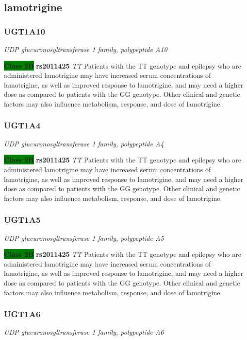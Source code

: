 \documentclass{report}
\begin{document}
\subsection{ lamotrigine }\subsubsection{ UGT1A10 }
\textit{ UDP glucuronosyltransferase 1 family, polypeptide A10 } \newline





\textbf{\colorbox{green} {Class 2B}} \textbf{ rs2011425 } \textit{ TT }
Patients with the TT genotype and epilepsy who are administered lamotrigine may have increased serum concentrations of lamotrigine, as well as improved response to lamotrigine, and may need a higher dose as compared to patients with the GG genotype. Other clinical and genetic factors may also influence metabolism, response, and dose of lamotrigine.  \newline\subsubsection{ UGT1A4 }
\textit{ UDP glucuronosyltransferase 1 family, polypeptide A4 } \newline





\textbf{\colorbox{green} {Class 2B}} \textbf{ rs2011425 } \textit{ TT }
Patients with the TT genotype and epilepsy who are administered lamotrigine may have increased serum concentrations of lamotrigine, as well as improved response to lamotrigine, and may need a higher dose as compared to patients with the GG genotype. Other clinical and genetic factors may also influence metabolism, response, and dose of lamotrigine.  \newline\subsubsection{ UGT1A5 }
\textit{ UDP glucuronosyltransferase 1 family, polypeptide A5 } \newline





\textbf{\colorbox{green} {Class 2B}} \textbf{ rs2011425 } \textit{ TT }
Patients with the TT genotype and epilepsy who are administered lamotrigine may have increased serum concentrations of lamotrigine, as well as improved response to lamotrigine, and may need a higher dose as compared to patients with the GG genotype. Other clinical and genetic factors may also influence metabolism, response, and dose of lamotrigine.  \newline\subsubsection{ UGT1A6 }
\textit{ UDP glucuronosyltransferase 1 family, polypeptide A6 } \newline
\end{document}
